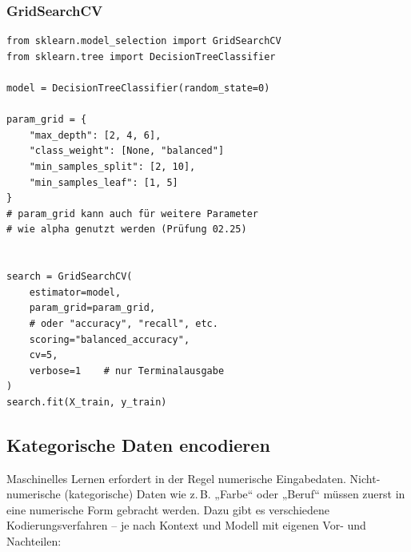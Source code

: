 
\subsubsection{GridSearchCV}
\begin{propertylist}[Faustregeln]
\end{propertylist}
\begin{codebox}
\begin{lstlisting}[style=CodeExpert]
from sklearn.model_selection import GridSearchCV
from sklearn.tree import DecisionTreeClassifier

model = DecisionTreeClassifier(random_state=0)

param_grid = {
    "max_depth": [2, 4, 6],
    "class_weight": [None, "balanced"]
    "min_samples_split": [2, 10],
    "min_samples_leaf": [1, 5]
}
# param_grid kann auch für weitere Parameter
# wie alpha genutzt werden (Prüfung 02.25)


search = GridSearchCV(
    estimator=model,
    param_grid=param_grid,
    # oder "accuracy", "recall", etc.
    scoring="balanced_accuracy",
    cv=5,
    verbose=1    # nur Terminalausgabe
)
search.fit(X_train, y_train)
\end{lstlisting}
\end{codebox}



\subsection{Kategorische Daten encodieren}\label{sec:08-kategorische-daten}
\begin{contentbox}
Maschinelles Lernen erfordert in der Regel numerische Eingabedaten. Nicht-numerische (kategorische) Daten wie z.\,B. „Farbe“ oder „Beruf“ müssen zuerst in eine numerische Form gebracht werden. Dazu gibt es verschiedene Kodierungsverfahren – je nach Kontext und Modell mit eigenen Vor- und Nachteilen:
\end{contentbox}


